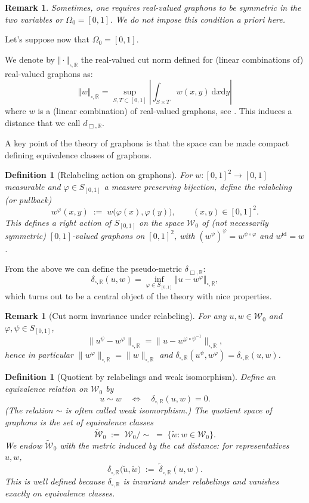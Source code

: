 \documentclass[12pt,twoside,a4paper]{article}
\newtheorem{definition}[theorem]{Definition}
\newtheorem{remark}[theorem]{Remark}
\def\R{\mathbb{R}}
\newcommand{\InvRelabel}{S_{[0,1]}}
\newcommand{\NcutR}[1]{\Vert#1\Vert_{\square,\R}}
\newcommand{\NcutRSymbol}{\Vert\cdot\Vert_{\square,\R}}
\newcommand{\drv}{\mathrm{d}}
\begin{document}
\begin{remark}
Sometimes, one requires real-valued graphons to be symmetric in the two variables or $\Omega_0=[0,1]$. We do not impose this condition a priori here. 
\end{remark}

Let's suppose now that $\Omega_0=[0,1].$

We denote by $\NcutRSymbol$ the real-valued cut norm defined for (linear combinations of) real-valued graphons as:
\begin{equation}
	\label{eq_def_NcutR}
\NcutR{w} = \sup_{S,T \subset [0,1]} \left\vert \int_{S\times T} w(x,y)\ \drv x\drv y \right\vert
\end{equation}
where $w$ is a (linear combination) of real-valued graphons, see  \cite[Chapter 8]{LovaszGraphLimits}. This induces a distance that we call $d_{\Box,\R}$.

A key point of the theory of graphons is that the space can be made compact defining equivalence classes of graphons.  

\begin{definition}[Relabeling action on graphons]
For $w:[0,1]^2\to[0,1]$ measurable and $\varphi\in\InvRelabel$ a measure preserving bijection, define the \emph{relabeling} (or pullback)
\[
w^{\varphi}(x,y)\;:=\; w\big(\varphi(x),\varphi(y)\big),\qquad (x,y)\in[0,1]^2.
\]
This defines a right action of $\InvRelabel$ on the space $\mathcal{W}_0$ of (not necessarily symmetric)
$[0,1]$-valued graphons on $[0,1]^2$, with $(w^{\psi})^{\varphi}=w^{\psi\circ\varphi}$ and $w^{\mathrm{id}}=w$.
\end{definition}
From the above we can define the pseudo-metric $\delta_{\Box,\R}$:
$$\delta_{\square,\R}(u,w)=\inf_{\varphi\in \InvRelabel}\NcutR{u-w^{\varphi}},$$
which turns out to be a central object of the theory with nice properties.

\begin{remark}[Cut norm invariance under relabeling]
For any $u,w\in\mathcal{W}_0$ and $\varphi,\psi\in\InvRelabel$,
\[
\big\|u^{\psi}-w^{\varphi}\big\|_{\square,\R}=\big\|u-w^{\varphi\circ\psi^{-1}}\big\|_{\square,\R},
\]
hence in particular $\|w^{\varphi}\|_{\square,\R}=\|w\|_{\square,\R}$ and
$\delta_{\square,\R}(u^{\psi},w^{\varphi})=\delta_{\square,\R}(u,w)$.
\end{remark}

\begin{definition}[Quotient by relabelings and weak isomorphism]\label{def:quotient}
Define an equivalence relation on $\mathcal{W}_0$ by
\[
u\sim w \quad \Longleftrightarrow \quad \delta_{\square,\R}(u,w)=0.
\]
(The relation $\sim$ is often called \emph{weak isomorphism}.) The \emph{quotient space of graphons}
is the set of equivalence classes
\[
\widetilde{\mathcal{W}}_0\;:=\;\mathcal{W}_0/\!\sim \;=\;\{\widetilde{w}: w\in\mathcal{W}_0\}.
\]
We endow $\widetilde{\mathcal{W}}_0$ with the metric induced by the cut distance:
for representatives $u,w$,
\[
\delta_{\square,\R}\big(\widetilde{u},\widetilde{w}\big)\;:=\;\tilde{\delta}_{\square,\R}(u,w).
\]
This is well defined because $\delta_{\square,\R}$ is invariant under relabelings and vanishes
exactly on equivalence classes.
\end{definition}
\end{document}
